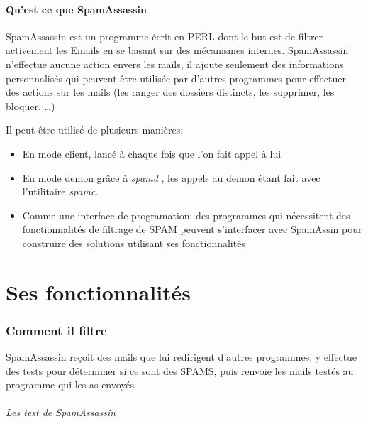 \documentclass[a4paper,11pt]{article}
\begin{document}
\subsection{Qu'est ce que SpamAssassin}

SpamAssassin est un programme écrit en PERL dont le but est de filtrer activement les Emails en se basant sur des mécanismes internes. 
SpamAssassin n'effectue aucune action envers les mails, il ajoute seulement des informations personnalisés
qui peuvent être utilisée par d'autres programmes pour effectuer des actions sur les mails (les ranger des dossiers distincts, les supprimer, les bloquer, \dots)


Il peut être utilisé de plusieurs manières:
\begin{itemize}
 \item En mode client, lancé à chaque fois que l'on fait appel à lui
 \item En mode demon grâce à \emph{spamd} , les appels au demon étant fait avec l'utilitaire \emph{spamc}.
 \item Comme une interface de programation: des programmes qui nécessitent des fonctionnalités de filtrage de SPAM peuvent s'interfacer avec SpamAssin
 pour construire des solutions utilisant ses fonctionnalités
\end{itemize}

\pagebreak

\part{Ses fonctionnalités}

\section{Comment il filtre}

SpamAssassin reçoit des mails que lui redirigent d'autres programmes, y effectue des tests pour déterminer si ce sont des SPAMS, 
puis renvoie les mails testés au programme qui les as envoyés.

\paragraph{Les test de SpamAssassin }
\end{document}
